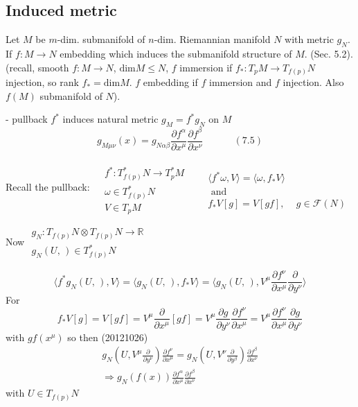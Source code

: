 \documentclass{book}
\begin{document}
\subsection{ Induced metric }

Let $M$ be $m$-dim. submanifold of $n$-dim. Riemannian manifold $N$ with metric $g_N$.  \\
If $f: M \to N$ embedding which induces the submanifold structure of $M$.  (Sec. 5.2).  \\
(recall, smooth $f:M\to N$, $\text{dim}{ M } \leq N$, $f$ immersion if $f_*: T_pM \to T_{f(p)}N$ injection, so rank $f_* = \text{dim}{M}$.  $f$ embedding if $f$ immersion and $f$ injection.  Also $f(M)$ submanifold of $N$).  

- pullback $f^*$ induces natural metric $g_M = f^* g_N$ on $M$
\begin{equation}
  g_{M \mu \nu}(x) = g_{ N \alpha \beta} \frac{ \partial f^{\alpha }}{ \partial x^{\mu }} \frac{ \partial f^{\beta} }{ \partial x^{\nu }} \quad \quad \quad \, (7.5)
\end{equation}

Recall the pullback: $\begin{aligned} & \quad \\ 
  & f^* : T^*_{f(p)}N \to T_p^*M \\
  & \omega \in T^*_{f(p)}N \\
  & V \in T_p M \end{aligned}$ \quad \quad \, $\begin{aligned} & \quad \\ 
  & \langle f^* \omega , V \rangle = \langle \omega, f_* V \rangle \\
  & \text{ and } \\
  & f_* V[g] = V[gf], \quad \, g\in \mathcal{F}(N) \end{aligned}$

Now $\begin{gathered} 
  g_N: T_{f(p) } N \otimes T_{f(p)} N \to \mathbb{R} \\
  g_N(U, \, ) \in T^*_{f(p)} N \end{gathered}$ 

\[
\langle f^* g_N(U, \, ) , V \rangle = \langle g_N(U, \, ), f_* V \rangle  = \langle g_N(U, \, ), V^{\mu} \frac{ \partial f^{\nu} }{ \partial x^{\mu} } \frac{ \partial }{ \partial y^{\nu}} \rangle 
\]
For 
\[
f_* V[g] = V[gf] = V^{\mu} \frac{ \partial }{ \partial x^{\mu} } [gf] = V^{\mu} \frac{ \partial g}{ \partial y^{\nu}} \frac{ \partial f^{\nu } }{ \partial x^{\mu }} = V^{\mu} \frac{ \partial f^{\nu }}{ \partial x^{\mu} } \frac{ \partial g}{ \partial y^{\nu} }
\]
with $gf(x^{\mu})$
so then (20121026)
\[
\begin{gathered}
  g_N\left(U, V^{\mu} \frac{ \partial }{ \partial y^{\nu }} \right) \frac{ \partial f^{\nu} }{ \partial x^{\mu }} = g_N(U, V^{\nu} \frac{ \partial }{ \partial y^{\beta} } ) \frac{ \partial f^{\beta} }{ \partial x^{\nu }} \\ 
  \Longrightarrow g_N(f(x)) \frac{ \partial f^{\alpha }}{ \partial x^{\mu} } \frac{ \partial f^{\beta}}{ \partial x^{\nu }}
\end{gathered}
\]
with $U \in T_{f(p)}N$
\end{document}
